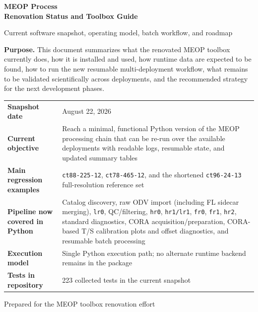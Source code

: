 \documentclass[11pt,a4paper]{article}
\newcommand{\pkg}[1]{\texttt{#1}}
\begin{document}
\begin{titlepage}
  \centering
  \vspace*{1.7cm}
  {\Huge\bfseries\color{meopblue}MEOP Process\\[0.25em] Renovation Status and Toolbox Guide\par}
  \vspace{0.8cm}
  {\Large Current software snapshot, operating model, batch workflow, and roadmap\par}
  \vspace{1.2cm}

  \noindent\colorbox{meoplight}{%
    \parbox{0.93\textwidth}{
      \vspace{0.35cm}
      \textbf{Purpose.} This document summarizes what the renovated MEOP toolbox currently does, how it is installed and used, how runtime data are expected to be found, how to run the new resumable multi-deployment workflow, what remains to be validated scientifically across deployments, and the recommended strategy for the next development phases.
      \vspace{0.35cm}
    }
  }

  \vspace{1.2cm}

  \begin{tabularx}{0.93\textwidth}{>{\bfseries}p{}X}
    Snapshot date & August 22, 2026 \\
    Current objective & Reach a minimal, functional Python version of the MEOP processing chain that can be re-run over the available deployments with readable logs, resumable state, and updated summary tables \\
    Main regression examples & \pkg{ct88-225-12}, \pkg{ct78-465-12}, and the shortened \pkg{ct96-24-13} full-resolution reference set \\
    Pipeline now covered in Python & Catalog discovery, raw ODV import (including FL sidecar merging), \pkg{lr0}, QC/filtering, \pkg{hr0}, \pkg{hr1/lr1}, \pkg{fr0}, \pkg{fr1}, \pkg{hr2}, standard diagnostics, CORA acquisition/preparation, CORA-based T/S calibration plots and offset diagnostics, and resumable batch processing \\
    Execution model & Single Python execution path; no alternate runtime backend remains in the package \\
    Tests in repository & 223 collected tests in the current snapshot \\
  \end{tabularx}

  \vfill
  {\large Prepared for the MEOP toolbox renovation effort\par}
\end{titlepage}
\end{document}

